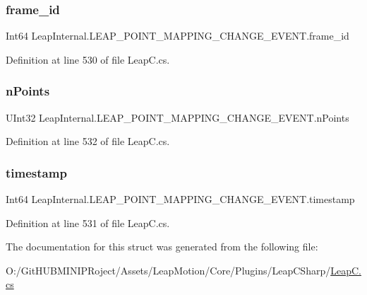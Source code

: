 \subsubsection{\texorpdfstring{frame\_id}{frame\_id}}
{\footnotesize\ttfamily Int64 Leap\+Internal.\+L\+E\+A\+P\+\_\+\+P\+O\+I\+N\+T\+\_\+\+M\+A\+P\+P\+I\+N\+G\+\_\+\+C\+H\+A\+N\+G\+E\+\_\+\+E\+V\+E\+N\+T.\+frame\+\_\+id}



Definition at line 530 of file Leap\+C.\+cs.

\mbox{\label{struct_leap_internal_1_1_l_e_a_p___p_o_i_n_t___m_a_p_p_i_n_g___c_h_a_n_g_e___e_v_e_n_t_a8b47a857ceb31bba6487f500752aaf93}} 
\subsubsection{\texorpdfstring{nPoints}{nPoints}}
{\footnotesize\ttfamily U\+Int32 Leap\+Internal.\+L\+E\+A\+P\+\_\+\+P\+O\+I\+N\+T\+\_\+\+M\+A\+P\+P\+I\+N\+G\+\_\+\+C\+H\+A\+N\+G\+E\+\_\+\+E\+V\+E\+N\+T.\+n\+Points}



Definition at line 532 of file Leap\+C.\+cs.

\mbox{\label{struct_leap_internal_1_1_l_e_a_p___p_o_i_n_t___m_a_p_p_i_n_g___c_h_a_n_g_e___e_v_e_n_t_a83040469eb5f71dc25b60b2c7f03885c}} 
\subsubsection{\texorpdfstring{timestamp}{timestamp}}
{\footnotesize\ttfamily Int64 Leap\+Internal.\+L\+E\+A\+P\+\_\+\+P\+O\+I\+N\+T\+\_\+\+M\+A\+P\+P\+I\+N\+G\+\_\+\+C\+H\+A\+N\+G\+E\+\_\+\+E\+V\+E\+N\+T.\+timestamp}



Definition at line 531 of file Leap\+C.\+cs.



The documentation for this struct was generated from the following file\+:\begin{DoxyCompactItemize}
\item 
O\+:/\+Git\+H\+U\+B\+M\+I\+N\+I\+P\+Roject/\+Assets/\+Leap\+Motion/\+Core/\+Plugins/\+Leap\+C\+Sharp/\mbox{\hyperlink{_leap_c_8cs}{Leap\+C.\+cs}}\end{DoxyCompactItemize}
